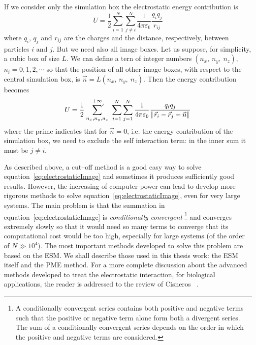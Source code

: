 If we consider only the simulation box the electrostatic energy contribution is
\begin{equation}
	U = \frac{1}{2}\sum_{i=1}^N\sum_{j\ne i}^N\frac{1}{4\pi\varepsilon_0}\frac{q_iq_j}{r_{ij}}
	\label{eq:electrostatic}
\end{equation}
where $q_i$, $q_j$ and $r_{ij}$ are the charges and the distance, respectively, between particles $i$ and $j$.
But we need also all image boxes. Let us suppose, for simplicity, a cubic box of size $L$. We can
define a tern of integer numbers $(n_x,\ n_y,\ n_z)$, $n_i=0,1,2,\cdots$ so that the position of all other image
boxes, with respect to the central simulation box, is $\vec n = L (n_x,\ n_y,\ n_z)$. Then the energy
contribution becomes
\begin{equation}
	U = \frac{1}{2}\ \sideset{}{'}\sum_{n_x,n_y,n_z}^{+\infty}\ \sum_{i=1}^N\sum_{j=1}^N\frac{1}{4\pi\varepsilon_0}\frac{q_iq_j}{\|\vec r_i - \vec r_j + \vec n \|}
	\label{eq:electrostaticImage}
\end{equation}
where the prime indicates that for $\vec n = 0$, i.e. the energy contribution of the simulation box, we need to
exclude the self interaction term: in the inner sum it must be $j \ne i$.

As described above, a cut--off method is a good easy way to solve equation~\eqref{eq:electrostaticImage} and 
sometimes it produces sufficiently good results. However, the increasing of computer power can lead to develop 
more rigorous methods to solve equation~\eqref{eq:electrostaticImage}, even for very large systems. The main 
problem is that the summation in equation~\eqref{eq:electrostaticImage} is \textit{conditionally convergent}
\footnote{A conditionally convergent series contains both positive and negative terms such that the positive or 
negative term alone form both a divergent series. The sum of a conditionally convergent series depends on the 
order in which the positive and negative terms are considered.} 
and converges extremely slowly so that it would need so many terms to converge that its computational cost would 
be too high, especially for large systems (of the order of $N \gg 10^4$). The most important methods developed 
to solve this problem are based on the \ac{ESM}. We shall describe those used in this thesis work: the \ac{ESM} 
itself and the \ac{PME} method. For a more complete discussion about the advanced methods developed to treat the 
electrostatic interaction, for biological applications, the reader is addressed to the review of Cisneros 
\etal\, \cite{Cisneros}.

